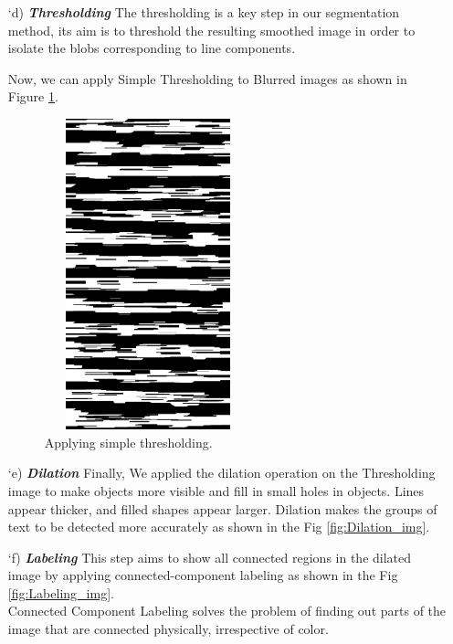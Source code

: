 \begin{itemize}
        
        \item[\char `d)] \textit{\textbf{Thresholding}}
        The thresholding is a key step in our segmentation method, its aim is to threshold the resulting smoothed image in order to isolate the blobs corresponding to line components.
        
        Now, we can apply Simple Thresholding to Blurred images as shown in Figure \ref{fig:treshold_img}.
        
        \begin{figure}[H]
            \centering
            \includegraphics[width=6cm, height=9cm]{images/threthold.png}
            \caption{Applying simple thresholding.}
            \label{fig:treshold_img}
        \end{figure}
        
        \item[\char `e)] \textit{\textbf{Dilation}}
        Finally, We applied the dilation operation on the Thresholding image to make objects more visible and fill in small holes in objects. Lines appear thicker, and filled shapes appear larger. Dilation makes the groups of text to be detected more accurately as shown in the Fig \ref{fig:Dilation_img}.%
        
        \item[\char `f)] \textit{\textbf{Labeling}}
        This step aims to show all connected regions in the dilated image by applying connected-component labeling as shown in the Fig \ref{fig:Labeling_img}.
        \\
        Connected Component Labeling solves the problem of finding out parts of the image that are connected physically, irrespective of color.
        

\end{itemize}
